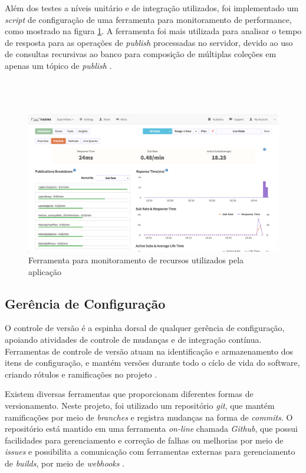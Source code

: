 Além dos testes a níveis unitário e de integração utilizados, foi implementado um \textit{script} de configuração de uma ferramenta para monitoramento de performance, como mostrado na figura \ref{fig:profile}. A ferramenta foi mais utilizada para analisar o tempo de resposta para as operações de \textit{publish} processadas no servidor, devido ao uso de consultas recursivas ao banco para composição de múltiplas coleções em apenas um tópico de \textit{publish} \cite{kadira2015}.
\\ 
\\
\\
\\
\begin{figure}[h!]
  	\centering
  	\includegraphics[width=.8\linewidth]{figuras/profile.eps}
  	\caption{Ferramenta para monitoramento de recursos utilizados pela aplicação}
  	\label{fig:profile}
\end{figure}

\subsection{Gerência de Configuração}

O controle de versão é a espinha dorsal de qualquer gerência de configuração, apoiando atividades de controle de mudanças e de integração contínua. Ferramentas de controle de versão atuam na identificação e armazenamento dos itens de configuração, e mantém versões durante todo o cíclo de vida do software, criando rótulos e ramificações no projeto \cite{swebok2014}. 

Existem diversas ferramentas que proporcionam diferentes formas de versionamento. Neste projeto, foi utilizado um repositório \textit{git}, que mantém ramificações por meio de \textit{branches} e registra mudanças na forma de \textit{commits}. O repositório está mantido em uma ferramenta \textit{on-line} chamada \textit{Github}, que possui facilidades para gerenciamento e correção de falhas ou melhorias por meio de \textit{issues} e possibilita a comunicação com ferramentas externas para gerenciamento de \textit{builds}, por meio de \textit{webhooks} \cite{github2015}.

